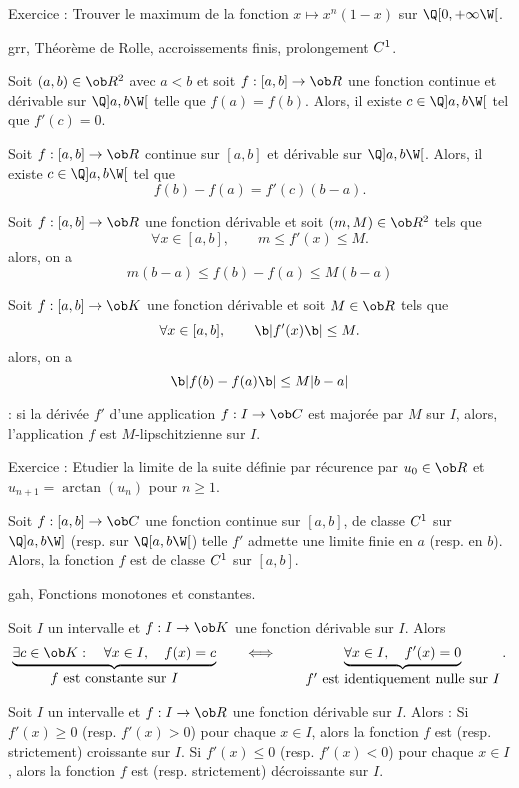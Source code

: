 Exercice :  Trouver le maximum de la fonction $x\mapsto x^n(1-x)$ sur $\Q[0,+\infty\W[$. 
\bigskip

\Subsection grr, Th\'eor\`eme de Rolle, accroissements finis, prolongement $\sc C^1$. 

\Theoreme [Title=Th\'eor\`eme de Rolle] Soit $(a,b)\in\ob R^2$ avec $a<b$ et soit $f:[a,b]\to\ob R$ une fonction continue et d\'erivable sur $\Q]a,b\W[$ telle que $f(a)=f(b)$. Alors, il existe $c\in\Q]a,b\W[$ tel que $f'(c)=0$. 
\bigskip

\Theoreme [Title=Egalit\'e des accroissements finis] 
Soit $f:[a,b]\to\ob R$ continue sur $[a,b]$ et d\'erivable sur $\Q]a,b\W[$. 
Alors, il existe $c\in\Q]a,b\W[$ tel que $$
f(b)-f(a)=f'(c)(b-a).
$$ 

\Theoreme [Title=In\'egalit\'es des accroissements finis] Soit $f:[a,b]\to\ob R$ une fonction d\'erivable et soit $(m,M)\in\ob R^2$ tels que 
$$
\forall x\in[a,b], \qquad m\le f'(x)\le M.
$$
alors, on a 
$$
m(b-a)\le f(b)-f(a)\le M(b-a)
$$
\bigskip

\Theoreme [Title=In\'egalit\'es des accroissements finis II]
Soit $f:[a,b]\to\ob K$ une fonction d\'erivable et soit $M\in\ob R$ tels que 
$$
\forall x\in[a,b], \qquad \b|f'(x)\b|\le M.
$$
alors, on a 
$$
\b|f(b)-f(a)\b|\le M|b-a|
$$

\Remarque : si la d\'eriv\'ee $f'$ d'une application $f:I\to\ob C$ est major\'ee par $M$ sur $I$, alors, l'application $f$ est $M$-lipschitzienne sur $I$. 
\bigskip 

Exercice :  Etudier la limite de la suite d\'efinie par r\'ecurence par $u_0\in\ob R$ et $u_{n+1}=\arctan(u_n)$ 
pour $n\ge1$. 
\bigskip

\Theoreme [Title=Th\'eor\`eme de prolongement $\sc C^1$]
Soit $f:[a,b]\to\ob C$ une fonction continue sur $[a,b]$, de classe $\sc C^1$ sur $\Q]a,b\W]$ (resp. sur $\Q[a,b\W[$) telle $f'$ admette une limite finie en $a$ (resp. en $b$). Alors, la fonction $f$ est de classe $\sc C^1$ sur $[a,b]$. 
\bigskip

\Subsection gah, Fonctions monotones et constantes. 

\Theoreme []  Soit $I$ un intervalle et $f:I\to\ob K$ une fonction d\'erivable sur $I$. Alors
$$
\underbrace{ \exists c\in\ob K: \quad\forall x\in I,\quad f(x)=c}_{\mbox{$f$ est constante sur $I$}}\qquad
\Longleftrightarrow\qquad \underbrace{\forall x\in I,\quad f'(x)=0}_{\mbox{$f'$ est identiquement nulle sur $I$}}.
$$


\Propriete []  Soit $I$ un intervalle et $f:I\to\ob R$ une fonction d\'erivable sur $I$. Alors : \pn
Si $f'(x)\ge0$ (resp. $f'(x)>0$) pour chaque $x\in I$, alors la fonction $f$ est (resp. strictement) croissante sur $I$. \pn
Si $f'(x)\le0$ (resp. $f'(x)< 0$) pour chaque $x\in I$, alors la fonction $f$ est (resp. strictement) d\'ecroissante sur $I$. \pn
\bigskip

